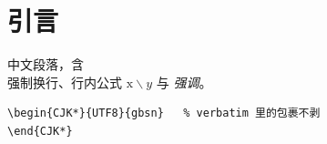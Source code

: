 \documentclass{article}
\newcommand{\g}[1]{\mathrm{#1}}
\begin{document}
\section{引言}
中文段落，含 \\ 强制换行、行内公式 $\g{x}\backslash y$ 与 \emph{强调}。

\begin{verbatim}
\begin{CJK*}{UTF8}{gbsn}   % verbatim 里的包裹不剥
\end{CJK*}
\end{verbatim}
\end{document}
